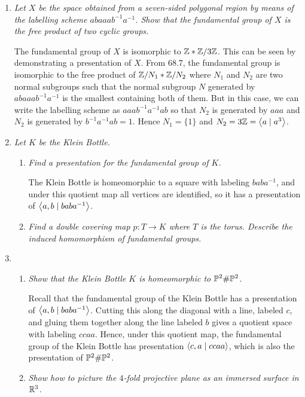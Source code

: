 \documentclass[10pt]{article}
\begin{document}
\begin{enumerate}
\item \emph{Let $X$ be the space obtained from a seven-sided polygonal region by means of the labelling scheme $abaaab^{-1}a^{-1}$.  Show that the fundamental group of $X$ is the free product of two cyclic groups.}

The fundamental group of $X$ is isomorphic to $\Z \ast \Z/3\Z$.  This can be seen by demonstrating a presentation of $X$.  From 68.7, the fundamental group is isomorphic to the free product of $\Z/N_1 \ast \Z/N_2$ where $N_1$ and $N_2$ are two normal subgroups such that the normal subgroup $N$ generated by $abaaab^{-1}a^{-1}$ is the smallest containing both of them.  But in this case, we can write the labelling scheme as $aaab^{-1}a^{-1}ab$ so that $N_2$ is generated by $aaa$ and $N_2$ is generated by $b^{-1}a^{-1}ab = 1$.  Hence $N_1 = \{1\}$ and $N_2 = 3\Z = \brac{a \mid a^3}$.

\item \emph{Let $K$ be the Klein Bottle.}
\begin{enumerate}
\item \emph{Find a presentation for the fundamental group of $K$.}

The Klein Bottle is homeomorphic to a square with labeling $baba^{-1}$, and under this quotient map all vertices are identified, so it has a presentation of $\brac{a,b \mid baba^{-1}}$.

\item \emph{Find a double covering map $p:T \rightarrow K$ where $T$ is the torus.  Describe the induced homomorphism of fundamental groups.}
\end{enumerate}

\item
\begin{enumerate}
\item \emph{Show that the Klein Bottle $K$ is homeomorphic to $\P^2 \# \P^2$.}

Recall that the fundamental group of the Klein Bottle has a presentation of $\brac{a,b \mid baba^{-1}}$.  Cutting this along the diagonal with a line, labeled $c$, and gluing them together along the line labeled $b$ gives a quotient space with labeling $ccaa$.  Hence, under this quotient map, the fundamental group of the Klein Bottle has presentation $\brac{c,a \mid ccaa}$, which is also the presentation of $\P^2 \# \P^2$.

\item \emph{Show how to picture the $4$-fold projective plane as an immersed surface in $\R^3$.}


\end{enumerate}
\end{enumerate}
\end{document}
